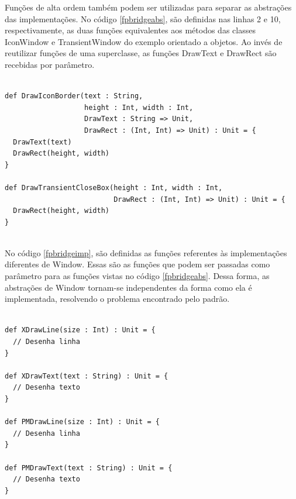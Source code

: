 Funções de alta ordem também podem ser utilizadas 
para separar as abstrações das implementações. 
No código \ref{fpbridgeabs}, são definidas nas 
linhas 2 e 10, respectivamente, as 
duas funções equivalentes aos métodos das 
classes IconWindow e TransientWindow do exemplo 
orientado a objetos. Ao invés de reutilizar 
funções de uma superclasse, as funções 
DrawText e DrawRect são recebidas por parâmetro.

\begin{lstlisting}[caption={Abstrações no Bridge Funcional},label=fpbridgeabs]
    
def DrawIconBorder(text : String,
                   height : Int, width : Int,
                   DrawText : String => Unit,
                   DrawRect : (Int, Int) => Unit) : Unit = {
  DrawText(text)
  DrawRect(height, width)
}

def DrawTransientCloseBox(height : Int, width : Int,
                          DrawRect : (Int, Int) => Unit) : Unit = {
  DrawRect(height, width)
}
    
\end{lstlisting}

No código \ref{fpbridgeimp}, são definidas as 
funções referentes às implementações diferentes 
de Window. Essas são as funções que podem ser 
passadas como parâmetro para as funções vistas 
no código \ref{fpbridgeabs}. Dessa forma, as 
abstrações de Window tornam-se independentes 
da forma como ela é implementada, resolvendo 
o problema encontrado pelo padrão.

\begin{lstlisting}[caption={Implementações no Bridge Funcional},label=fpbridgeimp]
    
def XDrawLine(size : Int) : Unit = {
  // Desenha linha
}

def XDrawText(text : String) : Unit = {
  // Desenha texto
}

def PMDrawLine(size : Int) : Unit = {
  // Desenha linha
}

def PMDrawText(text : String) : Unit = {
  // Desenha texto
}
    
\end{lstlisting}
